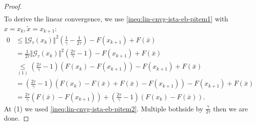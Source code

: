\documentclass[12pt]{article}
\begin{document}
\begin{proof}
\begin{align}
            \end{align}
            To derive the linear convergence, we use \eqref{ineq:lin-cnvg-ista-eb-pitem1} with $x = x_k, \tilde x = x_{k + 1}$:
            {\allowdisplaybreaks
            \begin{align*}
                0 &\le 
                \Vert \mathcal G_\tau(x_k)\Vert^2\left(
                    \frac{1}{\gamma} - \frac{1}{2\tau} 
                \right)
                - F(x_{k + 1}) + F(\bar x)
                \\
                &= 
                \frac{1}{2\tau}\Vert \mathcal G_\tau(x_k)\Vert^2\left(
                    \frac{2\tau}{\gamma} - 1
                \right)
                - F(x_{k + 1}) + F(\bar x)
                \\
                &\underset{(1)}{\le}
                \left(
                    \frac{2\tau}{\gamma} - 1
                \right)
                \left(
                    F(x_k) - F(x_{k + 1})
                \right)
                - F(x_{k + 1}) + F(\bar x)
                \\
                &= 
                \left(
                    \frac{2\tau}{\gamma} - 1
                \right)
                \left(
                    F(x_k) - F(\bar x) + F(\bar x) - F(x_{k + 1})
                \right)
                - F(x_{k + 1}) + F(\bar x)
                \\
                &= \frac{2\tau}{\gamma}(F(\bar x) - F(x_{k + 1}))
                + \left(
                    \frac{2\tau}{\gamma} - 1
                \right)(F(x_k) - F(\bar x)). 
            \end{align*}
            }
            At (1) we used \eqref{ineq:lin-cnvg-ista-eb-pitem2}. 
            Multiple bothside by $\frac{\gamma}{2\tau}$ then we are done. 
        \end{proof}
\end{document}
